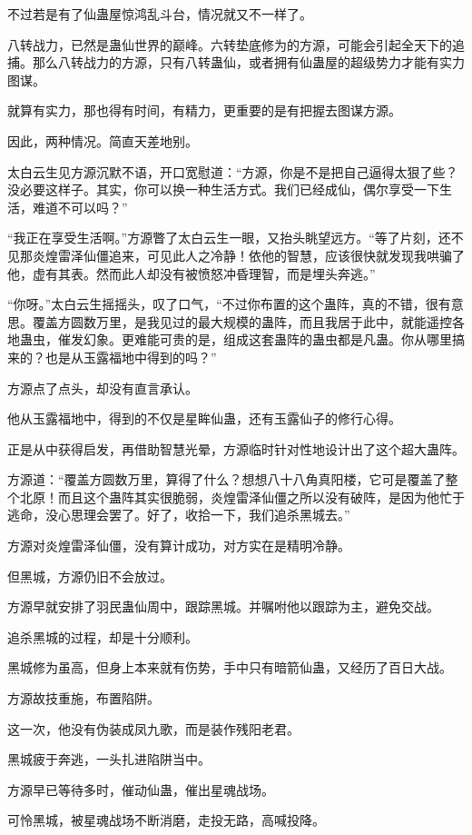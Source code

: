 \begin{this_body}
不过若是有了仙蛊屋惊鸿乱斗台，情况就又不一样了。

八转战力，已然是蛊仙世界的巅峰。六转垫底修为的方源，可能会引起全天下的追捕。那么八转战力的方源，只有八转蛊仙，或者拥有仙蛊屋的超级势力才能有实力图谋。

就算有实力，那也得有时间，有精力，更重要的是有把握去图谋方源。

因此，两种情况。简直天差地别。

太白云生见方源沉默不语，开口宽慰道：“方源，你是不是把自己逼得太狠了些？没必要这样子。其实，你可以换一种生活方式。我们已经成仙，偶尔享受一下生活，难道不可以吗？”

“我正在享受生活啊。”方源瞥了太白云生一眼，又抬头眺望远方。“等了片刻，还不见那炎煌雷泽仙僵追来，可见此人之冷静！依他的智慧，应该很快就发现我哄骗了他，虚有其表。然而此人却没有被愤怒冲昏理智，而是埋头奔逃。”

“你呀。”太白云生摇摇头，叹了口气，“不过你布置的这个蛊阵，真的不错，很有意思。覆盖方圆数万里，是我见过的最大规模的蛊阵，而且我居于此中，就能遥控各地蛊虫，催发幻象。更难能可贵的是，组成这套蛊阵的蛊虫都是凡蛊。你从哪里搞来的？也是从玉露福地中得到的吗？”

方源点了点头，却没有直言承认。

他从玉露福地中，得到的不仅是星眸仙蛊，还有玉露仙子的修行心得。

正是从中获得启发，再借助智慧光晕，方源临时针对性地设计出了这个超大蛊阵。

方源道：“覆盖方圆数万里，算得了什么？想想八十八角真阳楼，它可是覆盖了整个北原！而且这个蛊阵其实很脆弱，炎煌雷泽仙僵之所以没有破阵，是因为他忙于逃命，没心思理会罢了。好了，收拾一下，我们追杀黑城去。”

方源对炎煌雷泽仙僵，没有算计成功，对方实在是精明冷静。

但黑城，方源仍旧不会放过。

方源早就安排了羽民蛊仙周中，跟踪黑城。并嘱咐他以跟踪为主，避免交战。

追杀黑城的过程，却是十分顺利。

黑城修为虽高，但身上本来就有伤势，手中只有暗箭仙蛊，又经历了百日大战。

方源故技重施，布置陷阱。

这一次，他没有伪装成凤九歌，而是装作残阳老君。

黑城疲于奔逃，一头扎进陷阱当中。

方源早已等待多时，催动仙蛊，催出星魂战场。

可怜黑城，被星魂战场不断消磨，走投无路，高喊投降。


\end{this_body}
